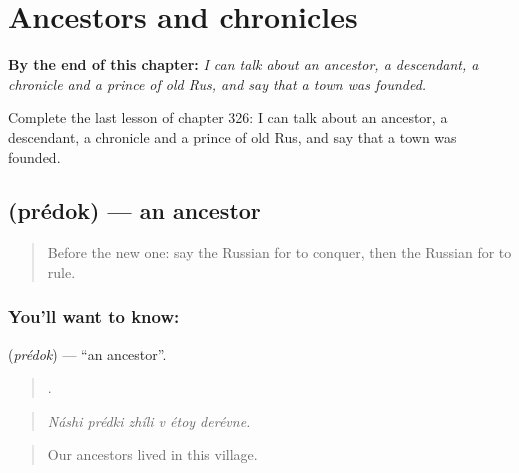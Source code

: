 
\chapter{Ancestors and chronicles}
\label{ch:ru-ancestors-and-chronicles}

\begin{chapteropening}
\textbf{By the end of this chapter:} \emph{I can talk about an ancestor, a descendant, a chronicle and a prince of old Rus, and say that a town was founded.}

Complete the last lesson of chapter 326: I can talk about an ancestor, a descendant, a chronicle and a prince of old Rus, and say that a town was founded.
\end{chapteropening}

\section[\texorpdfstring{\ru{предок} (prédok)}{предок (prédok)}]{ (prédok) — an ancestor}

\label{lesson:RU-C326-predok}



\begin{quote}
Before the new one: say the Russian for to conquer, then the Russian for to rule.
\end{quote}

\subsection*{You'll want to know: }
\textbf{} (\emph{prédok}) — \textquotedblleft{}an ancestor\textquotedblright{}.

\begin{quote}
     .
\end{quote}

\begin{quote}
\emph{Náshi prédki zhíli v étoy derévne.}
\end{quote}

\begin{quote}
Our ancestors lived in this village.
\end{quote}

